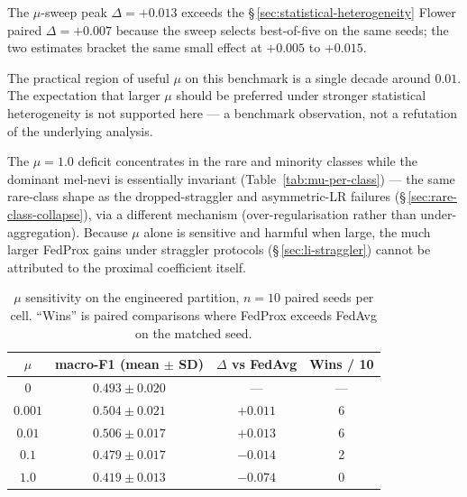 \documentclass[11pt,a4paper]{report}
\begin{document}
The $\mu$-sweep peak $\Delta = +0.013$ exceeds the
\S\,\ref{sec:statistical-heterogeneity} Flower paired $\Delta = +0.007$
because the sweep selects best-of-five on the same seeds; the two estimates
bracket the same small effect at $+0.005$ to $+0.015$.

The practical region of useful $\mu$ on this benchmark is a single decade
around $0.01$. The expectation that larger $\mu$ should be preferred under
stronger statistical heterogeneity is not supported here --- a benchmark
observation, not a refutation of the underlying analysis.

The $\mu = 1.0$ deficit concentrates in the rare and minority classes while the
dominant mel-nevi is essentially invariant (Table~\ref{tab:mu-per-class}) --- the
same rare-class shape as the dropped-straggler and asymmetric-LR failures
(\S\,\ref{sec:rare-class-collapse}), via a different mechanism
(over-regularisation rather than under-aggregation). Because $\mu$ alone is
sensitive and harmful when large, the much larger FedProx gains under straggler
protocols (\S\,\ref{sec:li-straggler}) cannot be attributed to the proximal
coefficient itself.



\begin{table}[H]
\centering
\caption{$\mu$ sensitivity on the engineered partition, $n=10$ paired
seeds per cell. ``Wins'' is paired comparisons where FedProx exceeds
FedAvg on the matched seed.}
\label{tab:mu-sweep}
\begin{tabular}{cccc}
\toprule
$\mu$    & macro-F1 (mean $\pm$ SD)   & $\Delta$ vs FedAvg & Wins / 10 \\
\midrule
$0$      & $0.493 \pm 0.020$          & ---               & ---  \\
$0.001$  & $0.504 \pm 0.021$          & $+0.011$          & 6    \\
$0.01$   & $\mathbf{0.506 \pm 0.017}$ & $\mathbf{+0.013}$ & 6    \\
$0.1$    & $0.479 \pm 0.017$          & $-0.014$          & 2    \\
$1.0$    & $0.419 \pm 0.013$          & $-0.074$          & 0    \\
\bottomrule
\end{tabular}
\end{table}


\end{document}
